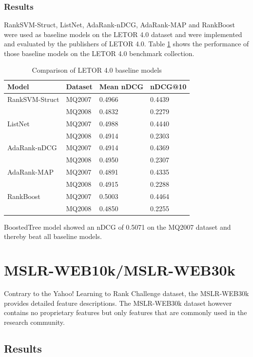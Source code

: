 \subsubsection{Results}
Rank\ac{SVM}-Struct, ListNet, AdaRank-\ac{nDCG}, AdaRank-\ac{MAP} and RankBoost were used as baseline models on the LETOR 4.0 dataset and were implemented and evaluated by the publishers of LETOR 4.0. Table \ref{tab:letor4_baseline_results} shows the performance of those baseline models on the LETOR 4.0 benchmark collection.\\

\begin{table}
\begin{tabular}{l|lll}
Model & Dataset & Mean \ac{nDCG} & \ac{nDCG}@10 \\ 
\hline
Rank\ac{SVM}-Struct & MQ2007 & 0.4966 & 0.4439 \\ 
 & MQ2008 & 0.4832 & 0.2279 \\ 
\hline
ListNet & MQ2007 & 0.4988 & 0.4440 \\ 
 & MQ2008 & 0.4914 & 0.2303 \\ 
\hline
AdaRank-\ac{nDCG} & MQ2007 & 0.4914 & 0.4369 \\ 
 & MQ2008 & 0.4950 & 0.2307 \\ 
\hline
AdaRank-\ac{MAP} & MQ2007 & 0.4891 & 0.4335 \\ 
 & MQ2008 & 0.4915 & 0.2288 \\ 
\hline
RankBoost & MQ2007 & 0.5003 & 0.4464 \\ 
 & MQ2008 & 0.4850 & 0.2255 \\ 
\end{tabular}
\caption{Comparison of LETOR 4.0 baseline models}
\label{tab:letor4_baseline_results}
\end{table}

BoostedTree model \cite{Kocsis2013} showed an \ac{nDCG} of 0.5071 on the MQ2007 dataset and thereby beat all baseline models.

\section{MSLR-WEB10k/MSLR-WEB30k}
Contrary to the Yahoo! Learning to Rank Challenge dataset, the MSLR-WEB30k provides detailed feature descriptions. The MSLR-WEB30k dataset however contains no proprietary features but only features that are commonly used in the research community.
\subsection{Results}


